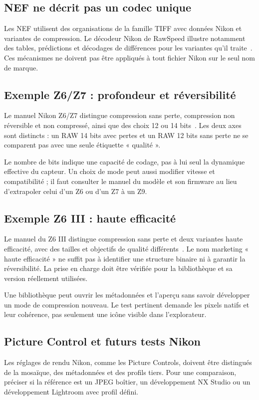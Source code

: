 \subsection{NEF ne décrit pas un codec unique}
Les NEF utilisent des organisations de la famille TIFF
avec données Nikon et variantes de compression. Le
décodeur Nikon de RawSpeed illustre notamment des
tables, prédictions et décodages de différences pour
les variantes qu'il traite~\cite{nikondecoder}.
Ces mécanismes ne doivent pas être appliqués à tout
fichier Nikon sur le seul nom de marque.

\subsection{Exemple Z6/Z7 : profondeur et réversibilité}
Le manuel Nikon Z6/Z7 distingue compression sans
perte, compression non réversible et non compressé,
ainsi que des choix 12 ou 14 bits~\cite{nikonmodes}.
Les deux axes sont distincts : un RAW 14 bits avec
pertes et un RAW 12 bits sans perte ne se comparent
pas avec une seule étiquette « qualité ».

Le nombre de bits indique une capacité de codage,
pas à lui seul la dynamique effective du capteur.
Un choix de mode peut aussi modifier vitesse et
compatibilité ; il faut consulter le manuel du
modèle et son firmware au lieu d'extrapoler celui
d'un Z6 ou d'un Z7 à un Z9.

\subsection{Exemple Z6 III : haute efficacité}
Le manuel du Z6 III distingue compression sans
perte et deux variantes haute efficacité, avec
des tailles et objectifs de qualité différents~\cite{nikonefficiency}.
Le nom marketing « haute efficacité » ne suffit
pas à identifier une structure binaire ni à
garantir la réversibilité. La prise en charge
doit être vérifiée pour la bibliothèque et sa
version réellement utilisées.

Une bibliothèque peut ouvrir les métadonnées
et l'aperçu sans savoir développer un mode
de compression nouveau. Le test pertinent
demande les pixels natifs et leur cohérence,
pas seulement une icône visible dans l'explorateur.

\subsection{Picture Control et futurs tests Nikon}
Les réglages de rendu Nikon, comme les Picture
Controls, doivent être distingués de la mosaïque,
des métadonnées et des profils tiers. Pour une
comparaison, préciser si la référence est un
JPEG boîtier, un développement NX Studio ou
un développement Lightroom avec profil défini.

